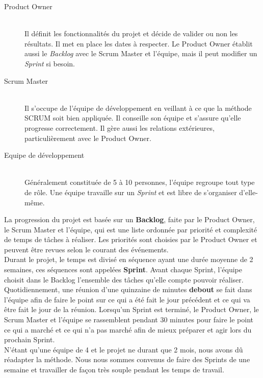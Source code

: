 \documentclass[11pt]{article}
\begin{document}
\begin{description}
	\item[Product Owner] \hfill \\
		Il définit les fonctionnalités du projet et décide de valider ou non les résultats. Il met en place les dates à respecter. Le Product Owner établit aussi le \textit{Backlog} avec le Scrum Master et l'équipe, mais il peut modifier un \textit{Sprint} si besoin.
	\item[Scrum Master] \hfill \\
		Il s'occupe de l'équipe de développement en veillant à ce que la méthode SCRUM soit bien appliquée. Il conseille son équipe et s'assure qu'elle progresse correctement. Il gère aussi les relations extérieures, particulièrement avec le Product Owner.
	\item[Equipe de développement] \hfill \\
		Généralement constituée de 5 à 10 personnes, l'équipe regroupe tout type de rôle. Une équipe travaille sur un \textit{Sprint} et est libre de s'organiser d'elle-même.
\end{description}

La progression du projet est basée sur un \textbf{Backlog}, faite par le Product Owner, le Scrum Master et l'équipe, qui est une liste ordonnée par priorité et complexité de temps de tâches à réaliser. Les priorités sont choisies par le Product Owner et peuvent être revues selon le courant des événements. \\

Durant le projet, le temps est divisé en séquence ayant une durée moyenne de 2 semaines, ces séquences sont appelées \textbf{Sprint}. Avant chaque Sprint, l'équipe choisit dans le Backlog l'ensemble des tâches qu'elle compte pouvoir réaliser. \\

Quotidiennement, une réunion d'une quinzaine de minutes \textbf{debout} se fait dans l'équipe afin de faire le point sur ce qui a été fait le jour précédent et ce qui va être fait le jour de la réunion. Lorsqu'un Sprint est terminé, le Product Owner, le Scrum Master et l'équipe se rassemblent pendant 30 minutes pour faire le point ce qui a marché et ce qui n'a pas marché afin de mieux préparer et agir lors du prochain Sprint. \\

N'étant qu'une équipe de 4 et le projet ne durant que 2 mois, nous avons dû réadapter la méthode. Nous nous sommes convenus de faire des Sprints de une semaine et travailler de façon très souple pendant les temps de travail.
\end{document}
